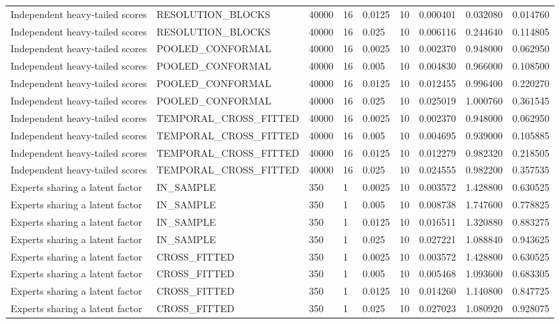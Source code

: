 \begin{tabular}{lllllllll}
Independent heavy-tailed scores & RESOLUTION\_BLOCKS & 40000 & 16 & 0.0125 & 10 & 0.000401 & 0.032080 & 0.014760 \\
Independent heavy-tailed scores & RESOLUTION\_BLOCKS & 40000 & 16 & 0.025 & 10 & 0.006116 & 0.244640 & 0.114805 \\
Independent heavy-tailed scores & POOLED\_CONFORMAL & 40000 & 16 & 0.0025 & 10 & 0.002370 & 0.948000 & 0.062950 \\
Independent heavy-tailed scores & POOLED\_CONFORMAL & 40000 & 16 & 0.005 & 10 & 0.004830 & 0.966000 & 0.108500 \\
Independent heavy-tailed scores & POOLED\_CONFORMAL & 40000 & 16 & 0.0125 & 10 & 0.012455 & 0.996400 & 0.220270 \\
Independent heavy-tailed scores & POOLED\_CONFORMAL & 40000 & 16 & 0.025 & 10 & 0.025019 & 1.000760 & 0.361545 \\
Independent heavy-tailed scores & TEMPORAL\_CROSS\_FITTED & 40000 & 16 & 0.0025 & 10 & 0.002370 & 0.948000 & 0.062950 \\
Independent heavy-tailed scores & TEMPORAL\_CROSS\_FITTED & 40000 & 16 & 0.005 & 10 & 0.004695 & 0.939000 & 0.105885 \\
Independent heavy-tailed scores & TEMPORAL\_CROSS\_FITTED & 40000 & 16 & 0.0125 & 10 & 0.012279 & 0.982320 & 0.218505 \\
Independent heavy-tailed scores & TEMPORAL\_CROSS\_FITTED & 40000 & 16 & 0.025 & 10 & 0.024555 & 0.982200 & 0.357535 \\
Experts sharing a latent factor & IN\_SAMPLE & 350 & 1 & 0.0025 & 10 & 0.003572 & 1.428800 & 0.630525 \\
Experts sharing a latent factor & IN\_SAMPLE & 350 & 1 & 0.005 & 10 & 0.008738 & 1.747600 & 0.778825 \\
Experts sharing a latent factor & IN\_SAMPLE & 350 & 1 & 0.0125 & 10 & 0.016511 & 1.320880 & 0.883275 \\
Experts sharing a latent factor & IN\_SAMPLE & 350 & 1 & 0.025 & 10 & 0.027221 & 1.088840 & 0.943625 \\
Experts sharing a latent factor & CROSS\_FITTED & 350 & 1 & 0.0025 & 10 & 0.003572 & 1.428800 & 0.630525 \\
Experts sharing a latent factor & CROSS\_FITTED & 350 & 1 & 0.005 & 10 & 0.005468 & 1.093600 & 0.683305 \\
Experts sharing a latent factor & CROSS\_FITTED & 350 & 1 & 0.0125 & 10 & 0.014260 & 1.140800 & 0.847725 \\
Experts sharing a latent factor & CROSS\_FITTED & 350 & 1 & 0.025 & 10 & 0.027023 & 1.080920 & 0.928075 \\

\end{tabular}
